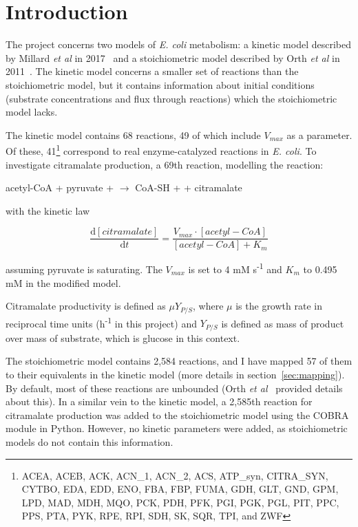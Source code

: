 \documentclass[parskip=full]{scrreprt}
\begin{document}
\chapter*{Introduction}
\label{ch:intro}

The project concerns two models of \emph{E. coli} metabolism: a kinetic model described by Millard \emph{et al} in 2017~\cite{millard_metabolic_2017} and a stoichiometric model described by Orth \emph{et al} in 2011~\cite{orth_comprehensive_2011}. The kinetic model concerns a smaller set of reactions than the stoichiometric model, but it contains information about initial conditions (substrate concentrations and flux through reactions) which the stoichiometric model lacks.

The kinetic model contains 68 reactions, 49 of which include $V_{max}$ as a parameter. Of these, 41\footnote{ACEA, ACEB, ACK, ACN\_1, ACN\_2, ACS, ATP\_syn, CITRA\_SYN, CYTBO, EDA, EDD, ENO, FBA, FBP, FUMA, GDH, GLT, GND, GPM, LPD, MAD, MDH, MQO, PCK, PDH, PFK, PGI, PGK, PGL, PIT, PPC, PPS, PTA, PYK, RPE, RPI, SDH, SK, SQR, TPI, and ZWF} correspond to real enzyme-catalyzed reactions in \emph{E. coli}. To investigate citramalate production, a 69th reaction, modelling the reaction:

\begin{center}
  acetyl-CoA + pyruvate +  $\rightarrow$ CoA-SH +  + citramalate
\end{center}

with the kinetic law

\[
  \frac{\mathrm{d}[citramalate]}{\mathrm{d}t} = 
  \frac{V_{max} \cdot [acetyl-CoA]}{[acetyl-CoA] + K_{m}}
\]

assuming pyruvate is saturating. The $V_{max}$ is set to 4 mM s\textsuperscript{-1} and $K_{m}$ to 0.495 mM in the modified model.

Citramalate productivity is defined as $\mu Y_{P/S}$, where $\mu$ is the growth rate in reciprocal time units (h\textsuperscript{-1} in this project) and $Y_{P/S}$ is defined as mass of product over mass of substrate, which is glucose in this context.

The stoichiometric model contains 2,584 reactions, and I have mapped 57 of them to their equivalents in the kinetic model (more details in section~\vref{sec:mapping}). By default, most of these reactions are unbounded (Orth \emph{et al}~\cite{orth_comprehensive_2011} provided details about this). In a similar vein to the kinetic model, a 2,585th reaction for citramalate production was added to the stoichiometric model using the COBRA module in Python. However, no kinetic parameters were added, as stoichiometric models do not contain this information.
\end{document}
